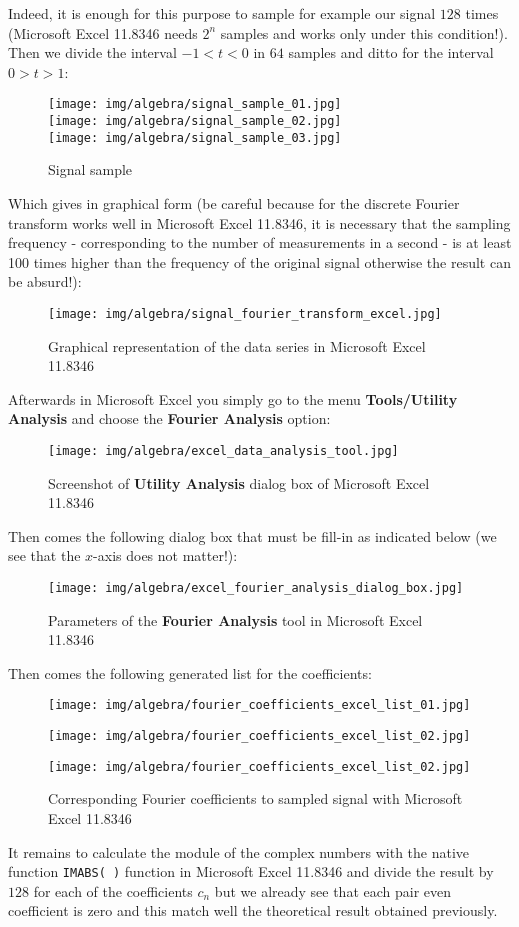 	Indeed, it is enough for this purpose to sample for example our signal $128$ times (Microsoft Excel 11.8346 needs $2^n$ samples and works only under this condition!). Then we divide the interval $-1<t<0$ in $64$ samples and ditto for the interval $0>t>1$:
	\begin{figure}[H]
		\centering
		\texttt{[image: img/algebra/signal\_sample\_01.jpg]}\\
		\texttt{[image: img/algebra/signal\_sample\_02.jpg]}\\
		\texttt{[image: img/algebra/signal\_sample\_03.jpg]}
		\caption[]{Signal sample}
	\end{figure}
	Which gives in graphical form (be careful because for the discrete Fourier transform works well in Microsoft Excel 11.8346, it is necessary that the sampling frequency - corresponding to the number of measurements in a second - is at least 100 times higher than the frequency of the original signal otherwise the result can be absurd!):
	\begin{figure}[H]
		\centering
		\texttt{[image: img/algebra/signal\_fourier\_transform\_excel.jpg]}
		\caption[]{Graphical representation of the data series in Microsoft Excel 11.8346}
	\end{figure}
	Afterwards in Microsoft Excel you simply go to the menu \textbf{Tools/Utility Analysis} and choose the \textbf{Fourier Analysis} option:
	\begin{figure}[H]
		\centering
		\texttt{[image: img/algebra/excel\_data\_analysis\_tool.jpg]}
		\caption[]{Screenshot of \textbf{Utility Analysis} dialog box of Microsoft Excel 11.8346}
	\end{figure}
	Then comes the following dialog box that must be fill-in as indicated below (we see that the $x$-axis does not matter!):
	\begin{figure}[H]
		\centering
		\texttt{[image: img/algebra/excel\_fourier\_analysis\_dialog\_box.jpg]}
		\caption[]{Parameters of the \textbf{Fourier Analysis} tool in Microsoft Excel 11.8346}
	\end{figure}
	Then comes the following generated list for the coefficients:
	\begin{figure}[H]
		\centering
		\texttt{[image: img/algebra/fourier\_coefficients\_excel\_list\_01.jpg]}
	\end{figure}
	\begin{figure}[H]
		\centering
		\texttt{[image: img/algebra/fourier\_coefficients\_excel\_list\_02.jpg]}
	\end{figure}
	\begin{figure}[H]
		\centering
		\texttt{[image: img/algebra/fourier\_coefficients\_excel\_list\_02.jpg]}
		\caption[]{Corresponding Fourier coefficients to sampled signal with Microsoft Excel 11.8346}
	\end{figure}
	It remains to calculate the module of the complex numbers with the native function  \texttt{IMABS( )} function in Microsoft Excel 11.8346 and divide the result by $128$ for each of the coefficients $c_n$ but we already see that each pair even coefficient  is zero and this match well the theoretical result obtained previously.
	
